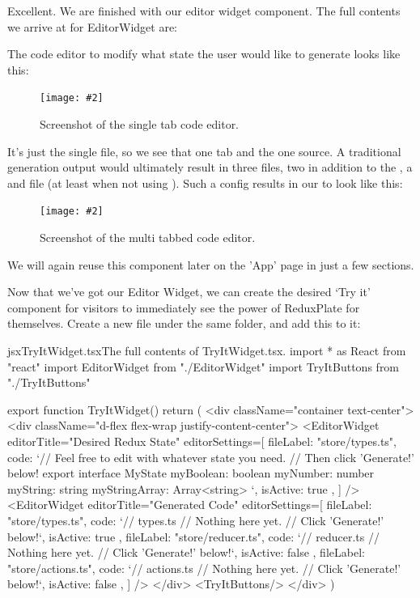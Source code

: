 \documentclass[paper=6in:9in,pagesize=pdftex,headinclude=on,footinclude=on,12pt]{scrbook}
\newcommand{\standardfigure}[3]{\begin{figure}[H]\begin{center}\texttt{[image: \#2]}\caption{#3}\label{fig:#2}\end{center}\end{figure}}
\begin{document}
Excellent. We are finished with our editor widget component. The full contents we arrive at for EditorWidget are:


The code editor to modify what state the user would like to generate looks like this:

\standardfigure{\textwidth}{frontend/components/single-editor}{Screenshot of the single tab code editor.}

It's just the single  file, so we see that one tab and the one source. A traditional generation output would ultimately result in three files, two in addition to the , a  and  file (at least when not using ). Such a config results in our  to look like this:

\standardfigure{\textwidth}{frontend/components/multi-editor}{Screenshot of the multi tabbed code editor.}

We will again reuse this component later on the 'App' page in just a few sections.


Now that we've got our Editor Widget, we can create the desired `Try it' component for visitors to immediately see the power of ReduxPlate for themselves. Create a new file  under the same  folder, and add this to it:

\begin{codeInput}{jsx}{TryItWidget.tsx}{The full contents of TryItWidget.tsx.}
import * as React from "react"
import { EditorWidget } from "./EditorWidget"
import { TryItButtons } from "./TryItButtons"

export function TryItWidget() {
  return (
    <div className="container text-center">
      <div className="d-flex flex-wrap justify-content-center">
        <EditorWidget
          editorTitle="Desired Redux State"
          editorSettings={[
            {
              fileLabel: "store/types.ts",
              code: `// Feel free to edit with whatever state you need.
// Then click 'Generate!' below!
export interface MyState {
    myBoolean: boolean
    myNumber: number
    myString: string
    myStringArray: Array<string>
}`,
isActive: true
            },
          ]}
        />
        <EditorWidget
          editorTitle="Generated Code"
          editorSettings={[
            {
              fileLabel: "store/types.ts",
              code: `// types.ts
// Nothing here yet.
// Click 'Generate!' below!`,
isActive: true
            },
            {
              fileLabel: "store/reducer.ts",
              code: `// reducer.ts
// Nothing here yet.
// Click 'Generate!' below!`,
isActive: false
            },
            {
              fileLabel: "store/actions.ts",
              code: `// actions.ts
// Nothing here yet.
// Click 'Generate!' below!`,
isActive: false
            },
          ]}
        />
      </div>
      <TryItButtons/>
    </div>
  )
}
\end{codeInput}
\end{document}
